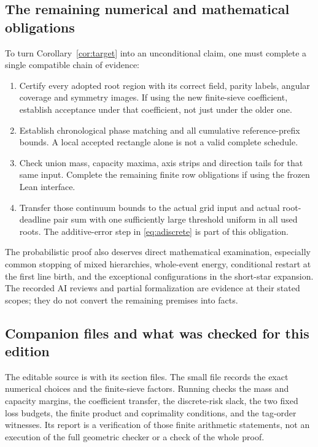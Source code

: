 \subsection{The remaining numerical and mathematical obligations}
To turn Corollary~\ref{cor:target} into an unconditional claim, one
must complete a single compatible chain of evidence:
\begin{enumerate}
\item Certify every adopted root region with its correct field,
parity labels, angular coverage and symmetry images. If using the
new finite-sieve coefficient, establish acceptance under that
coefficient, not just under the older one.
\item Establish chronological phase matching and all cumulative
reference-prefix bounds. A local accepted rectangle alone is not
a valid complete schedule.
\item Check union mass, capacity maxima, axis strips and direction
tails for that same input. Complete the remaining finite row
obligations if using the frozen Lean interface.
\item Transfer those continuum bounds to the actual grid input and
actual root-deadline pair sum with one sufficiently large threshold
uniform in all used roots. The additive-error step in
\eqref{eq:adiscrete} is part of this obligation.
\end{enumerate}
The probabilistic proof also deserves direct mathematical examination,
especially common stopping of mixed hierarchies, whole-event energy,
conditional restart at the first line birth, and the exceptional
configurations in the short-star expansion. The recorded AI reviews
and partial formalization are evidence at their stated scopes; they
do not convert the remaining premises into facts.

\subsection{Companion files and what was checked for this edition}
The editable source is  with its section files.
The small file  records the exact numerical
choices and the finite-sieve factors. Running
 checks the mass and capacity
margins, the coefficient transfer, the discrete-risk slack,
the two fixed loss budgets, the finite product and coprimality
conditions, and the tag-order witnesses. Its report is a verification
of those finite arithmetic statements, not an execution of the full
geometric checker or a check of the whole proof.

